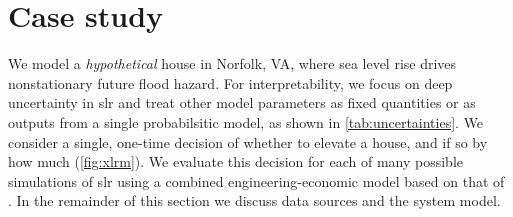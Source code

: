 \documentclass[12pt]{article}
\begin{document}
\section{Case study}\label{sec:case-study}

We model a \emph{hypothetical} house in Norfolk, VA, where sea level rise drives nonstationary future flood hazard.
For interpretability, we focus on deep uncertainty in \gls{slr} and treat other model parameters as fixed quantities or as outputs from a single probabilsitic model, as shown in \cref{tab:uncertainties}.
We consider a single, one-time decision of whether to elevate a house, and if so by how much (\cref{fig:xlrm}).
We evaluate this decision for each of many possible simulations of \gls{slr} using a combined engineering-economic model based on that of \citet{zarekarizi_suboptimal:2020}.
In the remainder of this section we discuss data sources and the system model.
\end{document}
